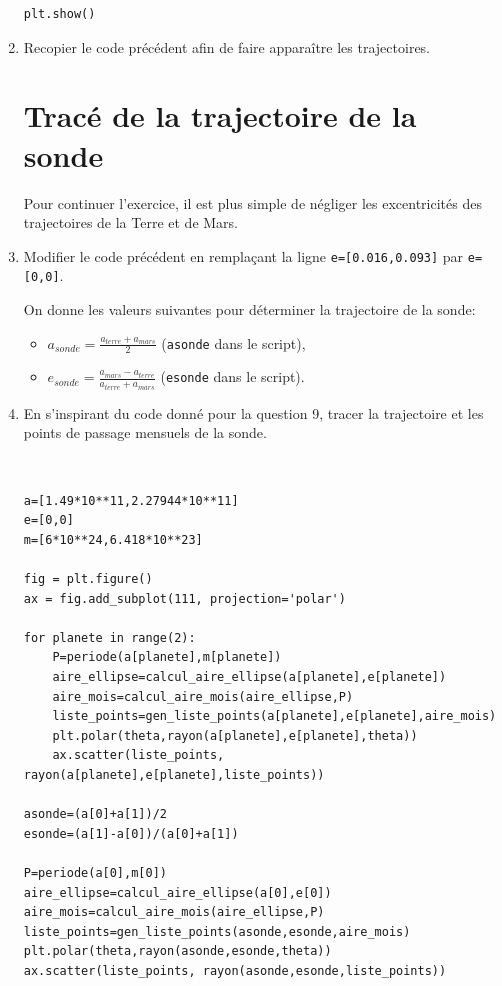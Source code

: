 \begin{enumerate}
\begin{verbatim}
plt.show()
\end{verbatim}

\item Recopier le code précédent afin de faire apparaître les trajectoires.

\section*{Tracé de la trajectoire de la sonde}

Pour continuer l'exercice, il est plus simple de négliger les excentricités des trajectoires de la Terre et de Mars.

\item Modifier le code précédent en remplaçant la ligne \verb?e=[0.016,0.093]? par \verb?e=[0,0]?.

On donne les valeurs suivantes pour déterminer la trajectoire de la sonde:
\begin{itemize}
 \item $a_{sonde}=\frac{a_{terre}+a_{mars}}{2}$ (\verb?asonde? dans le script),
 \item $e_{sonde}=\frac{a_{mars}-a_{terre}}{a_{terre}+a_{mars}}$ (\verb?esonde? dans le script).
\end{itemize}

\item En s'inspirant du code donné pour la question 9, tracer la trajectoire et les points de passage mensuels de la sonde.

\begin{solution}~\ \\
\begin{verbatim}
a=[1.49*10**11,2.27944*10**11]
e=[0,0]
m=[6*10**24,6.418*10**23]

fig = plt.figure()
ax = fig.add_subplot(111, projection='polar')

for planete in range(2):
    P=periode(a[planete],m[planete])
    aire_ellipse=calcul_aire_ellipse(a[planete],e[planete])
    aire_mois=calcul_aire_mois(aire_ellipse,P)
    liste_points=gen_liste_points(a[planete],e[planete],aire_mois)
    plt.polar(theta,rayon(a[planete],e[planete],theta))
    ax.scatter(liste_points, rayon(a[planete],e[planete],liste_points))

asonde=(a[0]+a[1])/2
esonde=(a[1]-a[0])/(a[0]+a[1])

P=periode(a[0],m[0])
aire_ellipse=calcul_aire_ellipse(a[0],e[0])
aire_mois=calcul_aire_mois(aire_ellipse,P)
liste_points=gen_liste_points(asonde,esonde,aire_mois)
plt.polar(theta,rayon(asonde,esonde,theta))
ax.scatter(liste_points, rayon(asonde,esonde,liste_points))


\end{verbatim}
\end{solution}
\end{enumerate}
